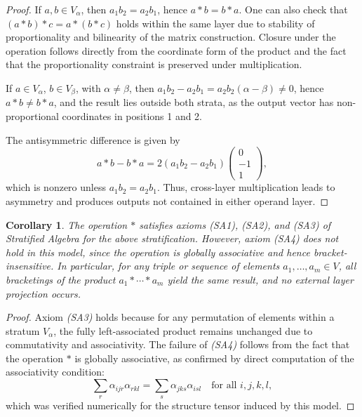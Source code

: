 \documentclass[12pt]{article}
\theoremstyle{definition}
\theoremstyle{plain}
\newtheorem{corollary}[definition]{Corollary}
\theoremstyle{remark}
\begin{document}
\begin{proof}
If \( a, b \in V_\alpha \), then \( a_1 b_2 = a_2 b_1 \), hence \( a * b = b * a \). One can also check that \( (a * b) * c = a * (b * c) \) holds within the same layer due to stability of proportionality and bilinearity of the matrix construction. Closure under the operation follows directly from the coordinate form of the product and the fact that the proportionality constraint is preserved under multiplication.

If \( a \in V_\alpha \), \( b \in V_\beta \), with \( \alpha \ne \beta \), then \( a_1 b_2 - a_2 b_1 = a_2 b_2 (\alpha - \beta) \ne 0 \), hence \( a * b \ne b * a \), and the result lies outside both strata, as the output vector has non-proportional coordinates in positions 1 and 2.

The antisymmetric difference is given by
\[
a * b - b * a = 2 (a_1 b_2 - a_2 b_1)
\begin{pmatrix}
0 \\
-1 \\
1
\end{pmatrix},
\]
which is nonzero unless \( a_1 b_2 = a_2 b_1 \). Thus, cross-layer multiplication leads to asymmetry and produces outputs not contained in either operand layer.
\end{proof}

\begin{corollary}
The operation \( * \) satisfies axioms \emph{(SA1)}, \emph{(SA2)}, and \emph{(SA3)} of Stratified Algebra for the above stratification. However, axiom \emph{(SA4)} does not hold in this model, since the operation is globally associative and hence bracket-insensitive. In particular, for any triple or sequence of elements \( a_1, \ldots, a_m \in V \), all bracketings of the product \( a_1 * \cdots * a_m \) yield the same result, and no external layer projection occurs.
\end{corollary}

\begin{proof}
Axiom \emph{(SA3)} holds because for any permutation of elements within a stratum \( V_\alpha \), the fully left-associated product remains unchanged due to commutativity and associativity. The failure of \emph{(SA4)} follows from the fact that the operation \( * \) is globally associative, as confirmed by direct computation of the associativity condition:
\[
\sum_r \alpha_{ijr} \alpha_{rkl} = \sum_s \alpha_{jks} \alpha_{isl}
\quad \text{for all } i, j, k, l,
\]
which was verified numerically for the structure tensor induced by this model.
\end{proof}
\end{document}
